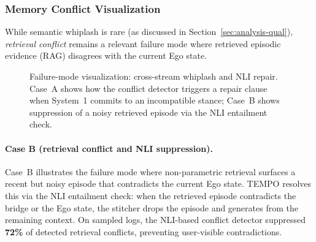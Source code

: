 \documentclass[11pt]{article}
\begin{document}
\subsubsection{Memory Conflict Visualization}
\label{app:failure-modes-fig}
While semantic whiplash is rare (as discussed in Section~\ref{sec:analysis-qual}), \emph{retrieval conflict} remains a relevant failure mode where retrieved episodic evidence (RAG) disagrees with the current Ego state.


\begin{figure}[h]
\centering
{}
\caption{Failure-mode visualization: cross-stream whiplash and NLI repair. Case~A shows how the conflict detector triggers a repair clause when System~1 commits to an incompatible stance; Case~B shows suppression of a noisy retrieved episode via the NLI entailment check.}
\label{fig:failure-modes-app}
\end{figure}

\paragraph{Case B (retrieval conflict and NLI suppression).}
Case~B illustrates the failure mode where non-parametric retrieval surfaces a recent but noisy episode that contradicts the current Ego state.
TEMPO resolves this via the NLI entailment check: when the retrieved episode contradicts the bridge or the Ego state, the stitcher drops the episode and generates from the remaining context.
On sampled logs, the NLI-based conflict detector suppressed \textbf{72\%} of detected retrieval conflicts, preventing user-visible contradictions.
\end{document}
